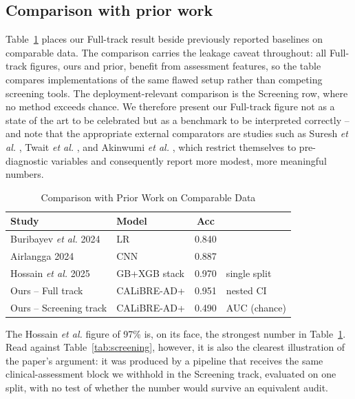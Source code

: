 \documentclass[conference]{IEEEtran}
\begin{document}
\subsection{Comparison with prior work}
\label{sec:comparison}
Table~\ref{tab:priorwork} places our Full-track result beside previously reported baselines on comparable data. The comparison carries the leakage caveat throughout: all Full-track figures, ours and prior, benefit from assessment features, so the table compares implementations of the same flawed setup rather than competing screening tools. The deployment-relevant comparison is the Screening row, where no method exceeds chance. We therefore present our Full-track figure not as a state of the art to be celebrated but as a benchmark to be interpreted correctly -- and note that the appropriate external comparators are studies such as Suresh \textit{et al.} \cite{b28}, Twait \textit{et al.} \cite{b27}, and Akinwumi \textit{et al.} \cite{b39}, which restrict themselves to pre-diagnostic variables and consequently report more modest, more meaningful numbers.

\begin{table}[!t]
\caption{Comparison with Prior Work on Comparable Data}
\label{tab:priorwork}
\centering
\footnotesize
\begin{tabular}{@{}p{2.5cm}p{1.6cm}cp{1.3cm}@{}}
\toprule
\textbf{Study} & \textbf{Model} & \textbf{Acc} & \\
\midrule
Buribayev \textit{et al.} 2024 \cite{b13} & LR & 0.840 & \\
Airlangga 2024 \cite{b20} & CNN & 0.887 & \\
Hossain \textit{et al.} 2025 \cite{b37} & GB+XGB stack & 0.970 & single split \\
Ours -- Full track & CALiBRE-AD+ & 0.951 & nested CI \\
Ours -- Screening track & CALiBRE-AD+ & 0.490 & AUC (chance) \\
\bottomrule
\end{tabular}
\end{table}

The Hossain \textit{et al.} figure of 97\% is, on its face, the strongest number in Table~\ref{tab:priorwork}. Read against Table~\ref{tab:screening}, however, it is also the clearest illustration of the paper's argument: it was produced by a pipeline that receives the same clinical-assessment block we withhold in the Screening track, evaluated on one split, with no test of whether the number would survive an equivalent audit.
\end{document}
